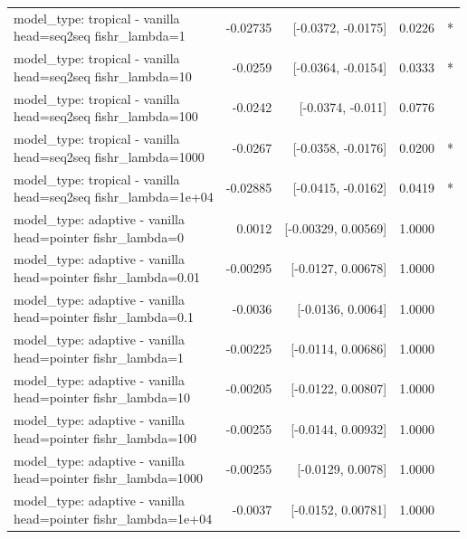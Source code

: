 \documentclass[10pt]{article}
\makeatletter
\newcommand{\stackcell}[1]{\begin{tabular}[t]{@{}l@{}}#1\end{tabular}}
\makeatother
\begin{document}
{\begin{longtable}{lrrrl}
\stackcell{model\_type: tropical - vanilla\\\footnotesize head=seq2seq fishr\_lambda=1 } & -0.02735 & [-0.0372, -0.0175] & 0.0226 & *\\
\stackcell{model\_type: tropical - vanilla\\\footnotesize head=seq2seq fishr\_lambda=10 } & -0.0259 & [-0.0364, -0.0154] & 0.0333 & *\\
\stackcell{model\_type: tropical - vanilla\\\footnotesize head=seq2seq fishr\_lambda=100 } & -0.0242 & [-0.0374, -0.011] & 0.0776 & \\
\stackcell{model\_type: tropical - vanilla\\\footnotesize head=seq2seq fishr\_lambda=1000 } & -0.0267 & [-0.0358, -0.0176] & 0.0200 & *\\
\stackcell{model\_type: tropical - vanilla\\\footnotesize head=seq2seq fishr\_lambda=1e+04 } & -0.02885 & [-0.0415, -0.0162] & 0.0419 & *\\
\stackcell{model\_type: adaptive - vanilla\\\footnotesize head=pointer fishr\_lambda=0 } & 0.0012 & [-0.00329, 0.00569] & 1.0000 & \\
\stackcell{model\_type: adaptive - vanilla\\\footnotesize head=pointer fishr\_lambda=0.01 } & -0.00295 & [-0.0127, 0.00678] & 1.0000 & \\
\stackcell{model\_type: adaptive - vanilla\\\footnotesize head=pointer fishr\_lambda=0.1 } & -0.0036 & [-0.0136, 0.0064] & 1.0000 & \\
\stackcell{model\_type: adaptive - vanilla\\\footnotesize head=pointer fishr\_lambda=1 } & -0.00225 & [-0.0114, 0.00686] & 1.0000 & \\
\stackcell{model\_type: adaptive - vanilla\\\footnotesize head=pointer fishr\_lambda=10 } & -0.00205 & [-0.0122, 0.00807] & 1.0000 & \\
\stackcell{model\_type: adaptive - vanilla\\\footnotesize head=pointer fishr\_lambda=100 } & -0.00255 & [-0.0144, 0.00932] & 1.0000 & \\
\stackcell{model\_type: adaptive - vanilla\\\footnotesize head=pointer fishr\_lambda=1000 } & -0.00255 & [-0.0129, 0.0078] & 1.0000 & \\
\stackcell{model\_type: adaptive - vanilla\\\footnotesize head=pointer fishr\_lambda=1e+04 } & -0.0037 & [-0.0152, 0.00781] & 1.0000 & \\

\end{longtable}}
\end{document}
